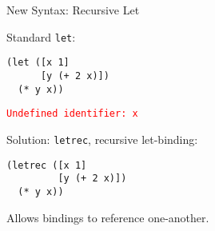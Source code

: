 \documentclass{beamer}
\begin{document}
\begin{frame}[fragile]{New Syntax: Recursive Let}

Standard \lstinline{let}:
\begin{lstlisting}
(let ([x 1]
      [y (+ 2 x)])
  (* y x))
\end{lstlisting}

\pause{} \vspace{0.25cm}

\textcolor{red}{\texttt{Undefined identifier: x}}

\pause{} \vspace{0.5cm}

Solution: \lstinline{letrec}, recursive let-binding:

\begin{lstlisting}
(letrec ([x 1]
         [y (+ 2 x)])
  (* y x))
\end{lstlisting}

Allows bindings to reference one-another.
\end{frame}
\end{document}
